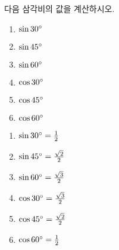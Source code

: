 \documentclass[a4paper]{oblivoir}
\begin{document}
\begin{Exercise}
다음 삼각비의 값을 계산하시오.
\begin{enumerate}[(1)]
\item
\(\sin 30\degree\)
\item
\(\sin 45\degree\)
\item
\(\sin 60\degree\)
\item
\(\cos 30\degree\)
\item
\(\cos 45\degree\)
\item
\(\cos 60\degree\)
\end{enumerate}
\end{Exercise}

\begin{Answer}
\begin{enumerate}[(1)]
\item
\(\sin 30\degree=\frac12\)
\item
\(\sin 45\degree=\frac{\sqrt2}2\)
\item
\(\sin 60\degree=\frac{\sqrt3}2\)
\item
\(\cos 30\degree=\frac{\sqrt3}2\)
\item
\(\cos 45\degree=\frac{\sqrt2}2\)
\item
\(\cos 60\degree=\frac12\)
\end{enumerate}
\end{Answer}
\shipoutAnswer
\end{document}
